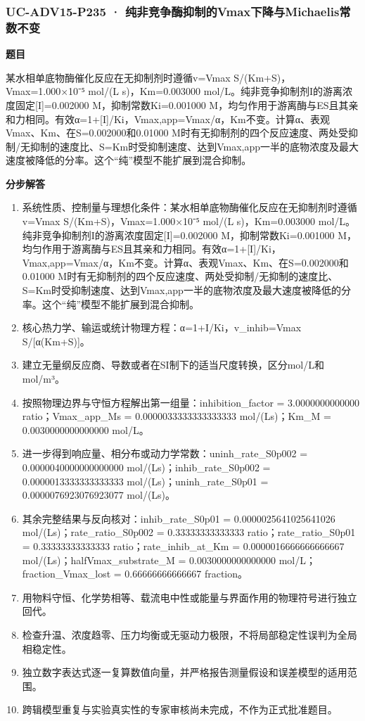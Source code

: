 \documentclass[UTF8,11pt,a4paper]{ctexart}
\begin{document}
\subsubsection*{UC-ADV15-P235 · 纯非竞争酶抑制的Vmax下降与Michaelis常数不变}
\noindent\textbf{题目}\par
某水相单底物酶催化反应在无抑制剂时遵循v=Vmax S/(Km+S)，Vmax=1.000×10⁻⁵ mol/(L s)，Km=0.003000 mol/L。纯非竞争抑制剂I的游离浓度固定[I]=0.002000 M，抑制常数Ki=0.001000 M，均匀作用于游离酶与ES且其亲和力相同。有效α=1+[I]/Ki，Vmax,app=Vmax/α，Km不变。计算α、表观Vmax、Km、在S=0.002000和0.01000 M时有无抑制剂的四个反应速度、两处受抑制/无抑制的速度比、S=Km时受抑制速度、达到Vmax,app一半的底物浓度及最大速度被降低的分率。这个“纯”模型不能扩展到混合抑制。\par
\medskip\noindent\textbf{分步解答}
\begin{enumerate}
\item 系统性质、控制量与理想化条件：某水相单底物酶催化反应在无抑制剂时遵循v=Vmax S/(Km+S)，Vmax=1.000×10⁻⁵ mol/(L s)，Km=0.003000 mol/L。纯非竞争抑制剂I的游离浓度固定[I]=0.002000 M，抑制常数Ki=0.001000 M，均匀作用于游离酶与ES且其亲和力相同。有效α=1+[I]/Ki，Vmax,app=Vmax/α，Km不变。计算α、表观Vmax、Km、在S=0.002000和0.01000 M时有无抑制剂的四个反应速度、两处受抑制/无抑制的速度比、S=Km时受抑制速度、达到Vmax,app一半的底物浓度及最大速度被降低的分率。这个“纯”模型不能扩展到混合抑制。
\item 核心热力学、输运或统计物理方程：α=1+I/Ki，v\_inhib=Vmax S/[α(Km+S)]。
\item 建立无量纲反应商、导数或者在SI制下的适当尺度转换，区分mol/L和mol/m³。
\item 按照物理边界与守恒方程解出第一组量：inhibition\_factor = 3.0000000000000 ratio；Vmax\_app\_Ms = 0.0000033333333333333 mol/(Ls)；Km\_M = 0.0030000000000000 mol/L。
\item 进一步得到响应量、相分布或动力学常数：uninh\_rate\_S0p002 = 0.0000040000000000000 mol/(Ls)；inhib\_rate\_S0p002 = 0.0000013333333333333 mol/(Ls)；uninh\_rate\_S0p01 = 0.0000076923076923077 mol/(Ls)。
\item 其余完整结果与反向核对：inhib\_rate\_S0p01 = 0.0000025641025641026 mol/(Ls)；rate\_ratio\_S0p002 = 0.33333333333333 ratio；rate\_ratio\_S0p01 = 0.33333333333333 ratio；rate\_inhib\_at\_Km = 0.0000016666666666667 mol/(Ls)；halfVmax\_substrate\_M = 0.0030000000000000 mol/L；fraction\_Vmax\_lost = 0.66666666666667 fraction。
\item 用物料守恒、化学势相等、载流电中性或能量与界面作用的物理符号进行独立回代。
\item 检查升温、浓度趋零、压力均衡或无驱动力极限，不将局部稳定性误判为全局相稳定性。
\item 独立数字表达式逐一复算数值向量，并严格报告测量假设和误差模型的适用范围。
\item 跨辑模型重复与实验真实性的专家审核尚未完成，不作为正式批准题目。
\end{enumerate}
\end{document}
